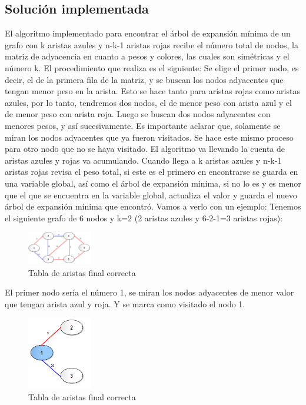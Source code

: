 \documentclass[conference,compsoc]{IEEEtran}
\begin{document}
\subsection{Solución implementada}
El algoritmo implementado para encontrar el árbol de expansión mínima de un grafo con k aristas azules y n-k-1 aristas rojas recibe el número total de nodos, la matriz de adyacencia en cuanto a pesos y colores, las cuales son simétricas y el número k. El procedimiento que realiza es el siguiente:
Se elige el primer nodo, es decir, el de la primera fila de la matriz, y se buscan los nodos adyacentes que tengan menor peso en la arista. Esto se hace tanto para aristas rojas como aristas azules, por lo tanto, tendremos dos nodos, el de menor peso con arista azul y el de menor peso con arista roja. Luego se buscan dos nodos adyacentes con menores pesos, y así sucesivamente. Es importante aclarar que, solamente se miran los nodos adyacentes que ya fueron visitados. Se hace este mismo proceso para otro nodo que no se haya visitado.
El algoritmo va llevando la cuenta de aristas azules y rojas va acumulando. Cuando llega a k aristas azules y n-k-1 aristas rojas revisa el peso total, si este es el primero en encontrarse se guarda en una variable global, así como el árbol de expansión mínima, si no lo es y es menor que el que se encuentra en la variable global, actualiza el valor y guarda el nuevo árbol de expansión mínima que encontró.
Vamos a verlo con un ejemplo:
Tenemos el siguiente grafo de 6 nodos y k=2 (2 aristas azules y 6-2-1=3 aristas rojas):
\begin{figure}[h] 
    \centering
    \includegraphics[width=0.25\textwidth]{Problema2/p21.png}
    \caption{Tabla de aristas final correcta}
    \label{fig:mesh1}
\end{figure}

El primer nodo sería el número 1, se miran los nodos adyacentes de menor valor que tengan arista azul y roja. Y se marca como visitado el nodo 1.
\begin{figure}[h] 
    \centering
    \includegraphics[width=0.25\textwidth]{Problema2/p22.png}
    \caption{Tabla de aristas final correcta}
    \label{fig:mesh1}
\end{figure}
\end{document}
